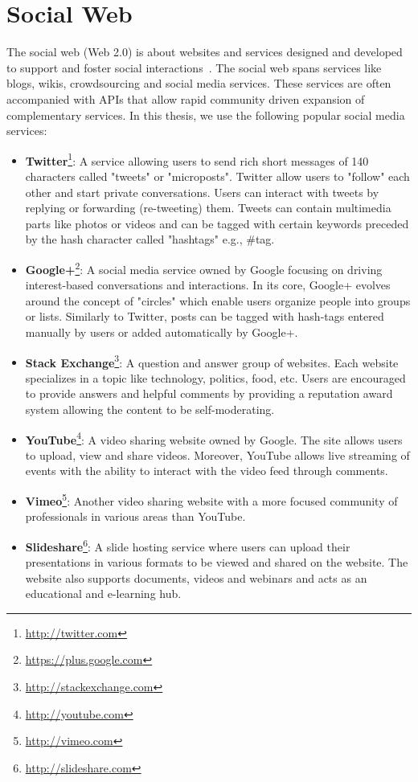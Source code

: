\section{Social Web}\label{social-web}

The social web (Web 2.0) is about websites and services designed and developed to support and foster social interactions~\cite{Porter:NewRiders:08}. The social web spans services like blogs, wikis, crowdsourcing and social media services. These services are often accompanied with APIs that allow rapid community driven expansion of complementary services. In this thesis, we use the following popular social media services:

\begin{itemize}
	\item \textbf{Twitter}\footnote{\url{http://twitter.com}}: A service allowing users to send rich short messages of 140 characters called "tweets" or "microposts". Twitter allow users to "follow" each other and start private conversations. Users can interact with tweets by replying or forwarding (re-tweeting) them. Tweets can contain multimedia parts like photos or videos and can be tagged with certain keywords preceded by the hash character called "hashtags" e.g., \#tag.
	\item \textbf{Google+}\footnote{\url{https://plus.google.com}}: A social media service owned by Google focusing on driving interest-based conversations and interactions. In its core, Google+ evolves around the concept of "circles" which enable users organize people into groups or lists. Similarly to Twitter, posts can be tagged with hash-tags entered manually by users or added automatically by Google+.
	\item \textbf{Stack Exchange}\footnote{\url{http://stackexchange.com}}: A question and answer group of websites. Each website specializes in a topic like technology, politics, food, etc. Users are encouraged to provide answers and helpful comments by providing a reputation award system allowing the content to be self-moderating.
	\item \textbf{YouTube}\footnote{\url{http://youtube.com}}: A video sharing website owned by Google. The site allows users to upload, view and share videos. Moreover, YouTube allows live streaming of events with the ability to interact with the video feed through comments.
	\item \textbf{Vimeo}\footnote{\url{http://vimeo.com}}: Another video sharing website with a more focused community of professionals in various areas than YouTube.
	\item \textbf{Slideshare}\footnote{\url{http://slideshare.com}}: A slide hosting service where users can upload their presentations in various formats to be viewed and shared on the website. The website also supports documents, videos and webinars and acts as an educational and e-learning hub.
\end{itemize}

